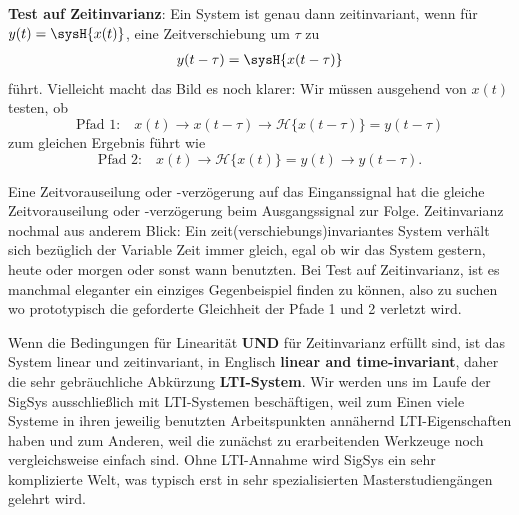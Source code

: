 \begin{Werkzeug}
\textbf{Test auf Zeitinvarianz}:
Ein System ist genau dann zeitinvariant, wenn für $y(t) = \sysH{x(t)}$,
eine Zeitverschiebung um $\tau$ zu
\begin{align}
y(t-\tau) = \sysH{x(t-\tau)}
\end{align}
führt.
Vielleicht macht das Bild es noch klarer:
Wir müssen ausgehend von $x(t)$ testen, ob
\begin{equation}
\text{Pfad 1:} \quad x(t)\rightarrow x(t-\tau)\rightarrow \mathcal{H}\{x(t-\tau)\}=y(t-\tau)
\end{equation}
zum gleichen Ergebnis führt wie
\begin{equation}
\text{Pfad 2:} \quad x(t)\rightarrow \mathcal{H}\{x(t)\}=y(t)\rightarrow y(t-\tau).
\end{equation}
%
\begin{center}
\end{center}
%
Eine Zeitvorauseilung oder -verzögerung auf das Einganssignal hat die gleiche
Zeitvorauseilung oder -verzögerung beim Ausgangssignal zur Folge.
%
Zeitinvarianz nochmal aus anderem Blick:
Ein zeit(verschiebungs)invariantes System verhält sich bezüglich
der Variable Zeit immer gleich, egal ob wir das System gestern, heute oder
morgen oder sonst wann benutzten.
%
Bei Test auf Zeitinvarianz, ist es manchmal eleganter ein einziges Gegenbeispiel
finden zu können, also zu suchen wo prototypisch die geforderte Gleichheit der
Pfade 1 und 2 verletzt wird.

Wenn die Bedingungen für Linearität \textbf{UND} für Zeitinvarianz erfüllt sind, ist das
System linear und zeitinvariant, in Englisch \textbf{linear and time-invariant}, daher die
sehr gebräuchliche Abkürzung \textbf{LTI-System}. Wir werden uns im Laufe der SigSys ausschließlich
mit LTI-Systemen beschäftigen, weil zum Einen viele Systeme in ihren jeweilig
benutzten Arbeitspunkten annähernd LTI-Eigenschaften haben und zum Anderen, weil die
zunächst zu erarbeitenden Werkzeuge noch vergleichsweise einfach sind.
Ohne LTI-Annahme wird SigSys ein sehr komplizierte Welt, was typisch erst in
sehr spezialisierten Masterstudiengängen gelehrt wird.
\end{Werkzeug}



